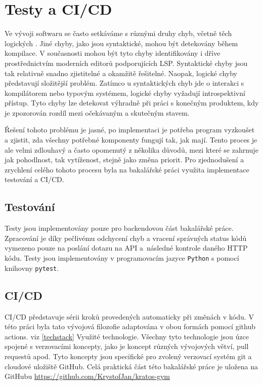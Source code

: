 \chapter{Testy a CI/CD} \label{testing&cicd}
Ve vývoji softwaru se často setkáváme s různými druhy chyb, včetně těch logických \cite{alzahrani2021common}. Jiné chyby, jako jsou syntaktické, mohou být detekovány během kompilace. V současnosti mohou být tyto chyby identifikovány i dříve prostřednictvím moderních editorů podporujících LSP. Syntaktické chyby jsou tak relativně snadno zjistitelné a okamžitě řešitelné. Naopak, logické chyby představují složitější problém. Zatímco u syntaktických chyb jde o interakci s kompilátorem nebo typovým systémem, logické chyby vyžadují introspektivní přístup. Tyto chyby lze detekovat výhradně při práci s konečným produktem, kdy je zpozorován rozdíl mezi očekávaným a skutečným stavem.

Řešení tohoto problému je jasné, po implementaci je potřeba program vyzkoušet a zjistit, zda všechny potřebné komponenty fungují tak, jak mají. Tento proces je ale velmi zdlouhavý a často opomenutý z několika důvodů, mezi které se zahrnuje jak pohodlnost, tak vytíženost, stejně jako změna priorit. Pro zjednodušení a zrychlení celého tohoto procesu byla na bakalářské práci využita implementace testování a CI/CD.

\section{Testování}
Testy jsou implementovány pouze pro backendovou část bakalářské práce. Zpracování je díky pečlivému odchycení chyb a vracení správných status kódů vymezeno pouze na poslání dotazu na API a~následné kontrole daného HTTP kódu. Testy jsou implementovány v programovacím jazyce \texttt{Python} s pomocí knihovny \texttt{pytest}.

\section{CI/CD}
CI/CD představuje sérii kroků provedených automaticky při změnách v kódu. V této práci byla tato vývojová filozofie adaptována v obou formách pomocí github actions. viz \ref{techstack} Využité technologie. Všechny tyto technologie jsou úzce spojené s verzovacími koncepty, jako je koncept různých vývojových větví, pull requestů apod. Tyto koncepty jsou specifické pro zvolený verzovací systém git a cloudové uložiště GitHub. Celá praktická část této bakalářské práce je uložena na GitHubu \url{https://github.com/KrystofJan/kratos-gym}

